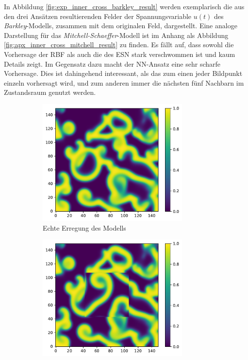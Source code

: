 In Abbildung \ref{fig:exp_inner_cross_barkley_result} werden exemplarisch die aus den drei Ansätzen resultierenden Felder der Spannungsvariable $u(t)$ des \textit{Barkley}-Modells, zusammen mit dem originalen Feld, dargestellt. Eine analoge Darstellung für das \textit{Mitchell-Schaeffer}-Modell ist im Anhang als Abbildung \ref{fig:apx_inner_cross_mitchell_result} zu finden. Es fällt auf, dass sowohl die Vorhersage der \textsc{RBF} als auch die des \textsc{ESN} stark verschwommen ist und kaum Details zeigt. Im Gegensatz dazu macht der \textsc{NN}-Ansatz eine sehr scharfe Vorhersage. Dies ist dahingehend interessant, als das zum einen jeder Bildpunkt einzeln vorhersagt wird, und zum anderen immer die nächsten fünf Nachbarn im Zustandsraum genutzt werden. 

\begin{figure}[H]
	\centering
	\begin{subfigure}{.5\textwidth}
		\centering
		\includegraphics[height=2.5in]{figures/results/inner_cross_prediction/barkley_u_inner_original.pdf}
		\setcapmargin[1cm]{0.5cm}
		\caption{Echte Erregung des Modells}
		\label{fig:exp_inner_cross_barkley_result_orig}
	\end{subfigure}%
	\begin{subfigure}{.5\textwidth}
		\centering
		\includegraphics[height=2.5in]{figures/results/inner_cross_prediction/barkley_u_inner_nn.pdf}

\end{subfigure}
\end{figure}
